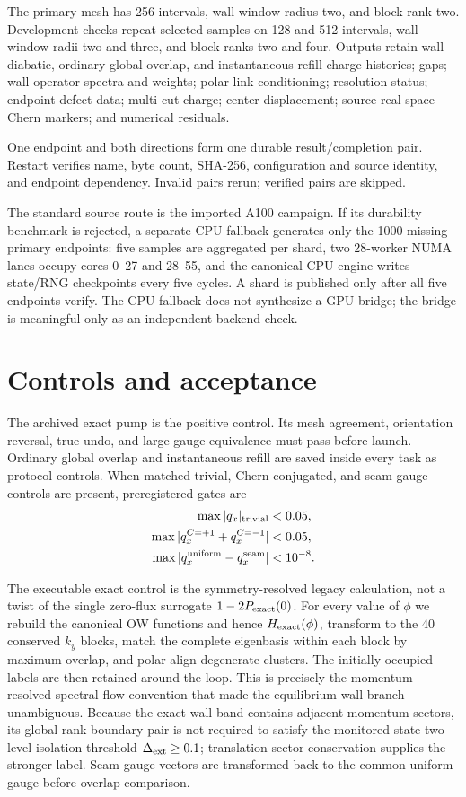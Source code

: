 \documentclass[aps,prb,twocolumn,floatfix,nofootinbib]{revtex4-2}
\begin{document}
The primary mesh has 256 intervals, wall-window radius two, and block rank two.
Development checks repeat selected samples on 128 and 512 intervals, wall
window radii two and three, and block ranks two and four.  Outputs retain
wall-diabatic, ordinary-global-overlap, and instantaneous-refill charge
histories; gaps; wall-operator spectra and weights; polar-link conditioning;
resolution status; endpoint defect data; multi-cut charge; center
displacement; source real-space Chern markers; and numerical residuals.

One endpoint and both directions form one durable result/completion pair.
Restart verifies name, byte count, SHA-256, configuration and source identity,
and endpoint dependency.  Invalid pairs rerun; verified pairs are skipped.

The standard source route is the imported A100 campaign.  If its durability
benchmark is rejected, a separate CPU fallback generates only the 1000
missing primary endpoints: five samples are aggregated per shard, two
28-worker NUMA lanes occupy cores 0--27 and 28--55, and the canonical CPU
engine writes state/RNG checkpoints every five cycles.  A shard is published
only after all five endpoints verify.  The CPU fallback does not synthesize a
GPU bridge; the bridge is meaningful only as an independent backend check.

\section{Controls and acceptance}

The archived exact pump is the positive control.  Its mesh agreement,
orientation reversal, true undo, and large-gauge equivalence must pass before
launch.  Ordinary global overlap and instantaneous refill are saved inside
every task as protocol controls.  When matched trivial, Chern-conjugated, and
seam-gauge controls are present, preregistered gates are
\begin{align}
 \max|q_x|_{\rm trivial}&<0.05,\\
 \max|q_x^{C=+1}+q_x^{C=-1}|&<0.05,\\
 \max|q_x^{\rm uniform}-q_x^{\rm seam}|&<10^{-8}.
\end{align}

The executable exact control is the symmetry-resolved legacy calculation,
not a twist of the single zero-flux surrogate $1-2P_{\rm exact}(0)$. For
every value of $\phi$ we rebuild the canonical OW functions and hence
$H_{\rm exact}(\phi)$, transform to the 40 conserved $k_y$ blocks, match the
complete eigenbasis within each block by maximum overlap, and polar-align
degenerate clusters. The initially occupied labels are then retained around
the loop. This is precisely the momentum-resolved spectral-flow convention
that made the equilibrium wall branch unambiguous. Because the exact wall
band contains adjacent momentum sectors, its global rank-boundary pair is not
required to satisfy the monitored-state two-level isolation threshold
$\Delta_{\rm ext}\geq0.1$; translation-sector conservation supplies the
stronger label. Seam-gauge vectors are transformed back to the common uniform
gauge before overlap comparison.
\end{document}
